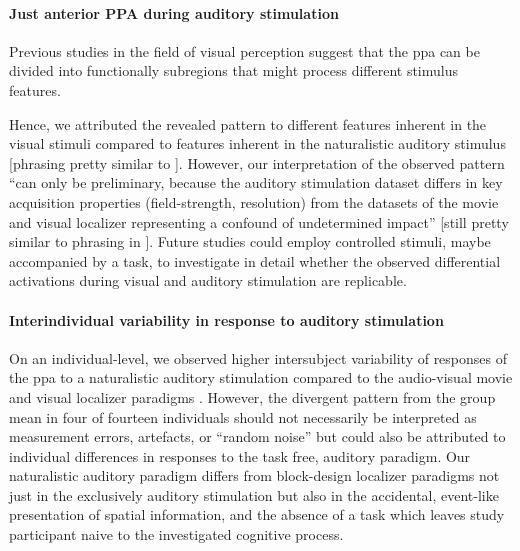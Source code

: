 \paragraph{Just anterior PPA during auditory stimulation}

Previous studies in the field of visual perception suggest that the \ac{ppa} can
be divided into functionally subregions that might process different stimulus
features.


%
Hence, we attributed the revealed pattern to different features inherent in the
visual stimuli compared to features inherent in the naturalistic auditory
stimulus [phrasing pretty similar to \citep{haeusler2022processing}].
%
However, our interpretation of the observed pattern ``can only be preliminary,
because the auditory stimulation dataset differs in key acquisition properties
(field-strength, resolution) from the datasets of the movie and visual localizer
representing a confound of undetermined impact'' [still pretty similar to
phrasing in \citep{haeusler2022processing}].
Future studies could employ controlled stimuli, maybe accompanied by a task, to
investigate in detail whether the observed differential activations during
visual and auditory stimulation are replicable.


\paragraph{Interindividual variability in response to auditory stimulation}

On an individual-level, we observed higher intersubject variability of responses
of the \ac{ppa} to a naturalistic auditory stimulation compared to the
audio-visual movie and visual localizer paradigms \citep[cf. Table 3
in][]{sengupta2016extension}.
However, the divergent pattern from the group mean in four of fourteen
individuals should not necessarily be interpreted as measurement errors,
artefacts, or ``random noise''  but could also be
attributed to individual differences in responses to the task free, auditory
paradigm.
%
Our naturalistic auditory paradigm differs from block-design localizer paradigms
not just in the exclusively auditory stimulation but also in the accidental,
event-like presentation of spatial information, and the absence of a task which
leaves study participant naive to the investigated cognitive process.



